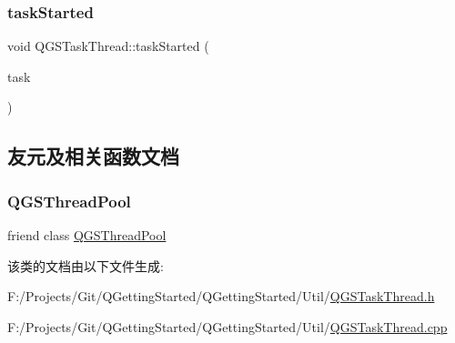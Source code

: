 \mbox{\label{class_q_g_s_task_thread_af0b8aba84fccadfded082f7f01dfe6d2}} 
\subsubsection{\texorpdfstring{task\+Started}{taskStarted}}
{\footnotesize\ttfamily void Q\+G\+S\+Task\+Thread\+::task\+Started (\begin{DoxyParamCaption}\item[{\mbox{\hyperlink{class_q_g_s_task}{Q\+G\+S\+Task}} $\ast$}]{task }\end{DoxyParamCaption})\hspace{0.3cm}{\ttfamily [signal]}}



\subsection{友元及相关函数文档}
\mbox{\label{class_q_g_s_task_thread_a70a47fdd33a3809c10b9d17a5a520378}} 
\subsubsection{\texorpdfstring{Q\+G\+S\+Thread\+Pool}{QGSThreadPool}}
{\footnotesize\ttfamily friend class \mbox{\hyperlink{class_q_g_s_thread_pool}{Q\+G\+S\+Thread\+Pool}}\hspace{0.3cm}{\ttfamily [friend]}}



该类的文档由以下文件生成\+:\begin{DoxyCompactItemize}
\item 
F\+:/\+Projects/\+Git/\+Q\+Getting\+Started/\+Q\+Getting\+Started/\+Util/\mbox{\hyperlink{_q_g_s_task_thread_8h}{Q\+G\+S\+Task\+Thread.\+h}}\item 
F\+:/\+Projects/\+Git/\+Q\+Getting\+Started/\+Q\+Getting\+Started/\+Util/\mbox{\hyperlink{_q_g_s_task_thread_8cpp}{Q\+G\+S\+Task\+Thread.\+cpp}}\end{DoxyCompactItemize}
